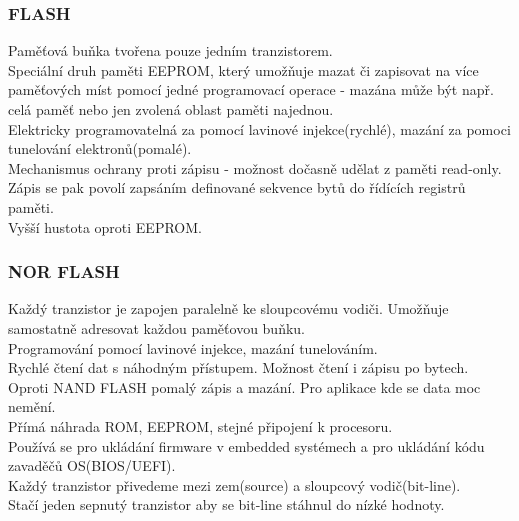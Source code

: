 \subsubsection*{FLASH}
Paměťová buňka tvořena pouze jedním tranzistorem.\\
Speciální druh paměti EEPROM, který umožňuje mazat či zapisovat na více paměťových míst pomocí jedné programovací operace - mazána může být např. celá paměť nebo jen zvolená oblast paměti najednou. \\
Elektricky programovatelná za pomocí lavinové injekce(rychlé), mazání za pomoci tunelování elektronů(pomalé).\\
Mechanismus ochrany proti zápisu - možnost dočasně udělat z paměti read-only. Zápis se pak povolí zapsáním definované sekvence bytů do řídících registrů paměti.\\
Vyšší hustota oproti EEPROM. \\

\subsubsection*{NOR FLASH}
Každý tranzistor je zapojen paralelně ke sloupcovému vodiči. Umožňuje samostatně adresovat každou paměťovou buňku.\\
Programování pomocí lavinové injekce, mazání tunelováním. \\
Rychlé čtení dat s náhodným přístupem. Možnost čtení i zápisu po bytech.\\
Oproti NAND FLASH pomalý zápis a mazání. Pro aplikace kde se data moc nemění.\\
Přímá náhrada ROM, EEPROM, stejné připojení k procesoru.\\
Používá se pro ukládání firmware v embedded systémech a pro ukládání kódu zavaděčů OS(BIOS/UEFI).\\
Každý tranzistor přivedeme mezi zem(source) a sloupcový vodič(bit-line).\\
Stačí jeden sepnutý tranzistor aby se bit-line stáhnul do nízké hodnoty. \\

